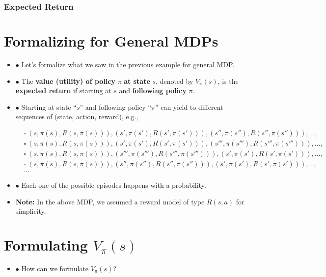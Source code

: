 \subsubsection{Expected Return}
\begin{derivation}
\section*{Formalizing for General MDPs}
\begin{itemize}
    \item $\bullet$ Let's formalize what we saw in the previous example for general MDP.
    \item $\bullet$ The \textbf{value (utility) of policy} $\pi$ \textbf{at state} $s$, denoted by $V_\pi(s)$, is the \textbf{expected return} if starting at $s$ and \textbf{following policy} $\pi$.
    \item $\bullet$ Starting at state ``$s$'' and following policy ``$\pi$'' can yield to different sequences of (state, action, reward), e.g.,

    \[
    \begin{aligned}
        &\square\ (s, \pi(s), R(s, \pi(s))), (s', \pi(s'), R(s', \pi(s'))), (s'', \pi(s''), R(s'', \pi(s''))), \dots, \\
        &\square\ (s, \pi(s), R(s, \pi(s))), (s', \pi(s'), R(s', \pi(s'))), (s''', \pi(s'''), R(s''', \pi(s'''))), \dots, \\
        &\square\ (s, \pi(s), R(s, \pi(s))), (s''', \pi(s'''), R(s''', \pi(s'''))), (s', \pi(s'), R(s', \pi(s'))), \dots, \\
        &\square\ (s, \pi(s), R(s, \pi(s))), (s'', \pi(s''), R(s'', \pi(s''))), (s', \pi(s'), R(s', \pi(s'))), \dots, \\
        &\dots
    \end{aligned}
    \]

    \item $\bullet$ Each one of the possible episodes happens with a probability.

    \item \textbf{Note:} In the above MDP, we assumed a reward model of type $R(s, a)$ for simplicity.
\end{itemize}

\section*{Formulating $V_\pi(s)$}
\begin{itemize}
    \item $\bullet$ How can we formulate $V_\pi(s)$?


\end{itemize}
\end{derivation}
